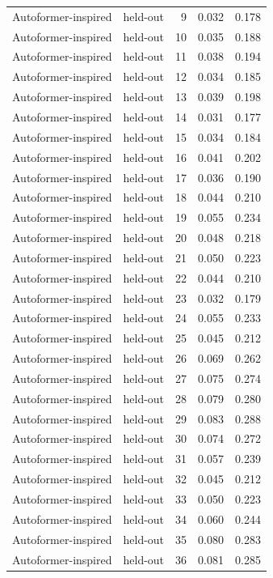 \begin{tabular}{llrrr}
Autoformer-inspired & held-out & 9 & 0.032 & 0.178 \\
Autoformer-inspired & held-out & 10 & 0.035 & 0.188 \\
Autoformer-inspired & held-out & 11 & 0.038 & 0.194 \\
Autoformer-inspired & held-out & 12 & 0.034 & 0.185 \\
Autoformer-inspired & held-out & 13 & 0.039 & 0.198 \\
Autoformer-inspired & held-out & 14 & 0.031 & 0.177 \\
Autoformer-inspired & held-out & 15 & 0.034 & 0.184 \\
Autoformer-inspired & held-out & 16 & 0.041 & 0.202 \\
Autoformer-inspired & held-out & 17 & 0.036 & 0.190 \\
Autoformer-inspired & held-out & 18 & 0.044 & 0.210 \\
Autoformer-inspired & held-out & 19 & 0.055 & 0.234 \\
Autoformer-inspired & held-out & 20 & 0.048 & 0.218 \\
Autoformer-inspired & held-out & 21 & 0.050 & 0.223 \\
Autoformer-inspired & held-out & 22 & 0.044 & 0.210 \\
Autoformer-inspired & held-out & 23 & 0.032 & 0.179 \\
Autoformer-inspired & held-out & 24 & 0.055 & 0.233 \\
Autoformer-inspired & held-out & 25 & 0.045 & 0.212 \\
Autoformer-inspired & held-out & 26 & 0.069 & 0.262 \\
Autoformer-inspired & held-out & 27 & 0.075 & 0.274 \\
Autoformer-inspired & held-out & 28 & 0.079 & 0.280 \\
Autoformer-inspired & held-out & 29 & 0.083 & 0.288 \\
Autoformer-inspired & held-out & 30 & 0.074 & 0.272 \\
Autoformer-inspired & held-out & 31 & 0.057 & 0.239 \\
Autoformer-inspired & held-out & 32 & 0.045 & 0.212 \\
Autoformer-inspired & held-out & 33 & 0.050 & 0.223 \\
Autoformer-inspired & held-out & 34 & 0.060 & 0.244 \\
Autoformer-inspired & held-out & 35 & 0.080 & 0.283 \\
Autoformer-inspired & held-out & 36 & 0.081 & 0.285 \\

\end{tabular}
